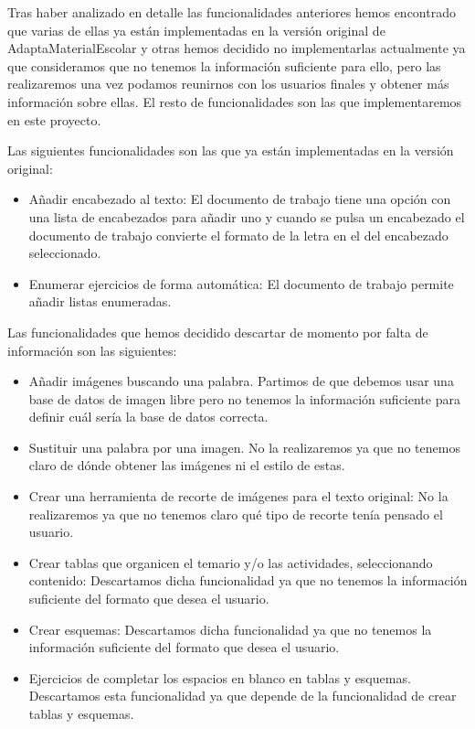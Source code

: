 Tras haber analizado en detalle las funcionalidades anteriores hemos encontrado que varias de ellas ya están implementadas en la versión original de AdaptaMaterialEscolar y otras hemos decidido no implementarlas actualmente ya que consideramos que no tenemos la información suficiente para ello, pero las realizaremos una vez podamos reunirnos con los usuarios finales y obtener más información sobre ellas. El resto de funcionalidades son las que implementaremos en este proyecto.

Las siguientes funcionalidades son las que ya están implementadas en la versión original:
\begin{itemize}
  \item Añadir encabezado al texto: El documento de trabajo tiene una opción con una lista de encabezados para añadir uno y cuando se pulsa un encabezado el documento de trabajo convierte el formato de la letra en el del encabezado seleccionado.
  \item Enumerar ejercicios de forma automática: El documento de trabajo permite añadir listas enumeradas.
\end{itemize}
Las funcionalidades que hemos decidido descartar de momento por falta de información son las siguientes:
\begin{itemize}
  \item Añadir imágenes buscando una palabra. Partimos de que debemos usar una base de datos de imagen libre pero no tenemos la información suficiente para definir cuál sería la base de datos correcta.
  \item Sustituir una palabra por una imagen. No la realizaremos ya que no tenemos claro de dónde obtener las imágenes ni el estilo de estas.
  \item Crear una herramienta de recorte de imágenes para el texto original: No la realizaremos ya que no tenemos claro qué tipo de recorte tenía pensado el usuario.
  \item Crear tablas que organicen el temario y/o las actividades, seleccionando contenido: Descartamos dicha funcionalidad ya que no tenemos la información suficiente del formato que desea el usuario.
  \item Crear esquemas: Descartamos dicha funcionalidad ya que no tenemos la información suficiente del formato que desea el usuario.
  \item Ejercicios de completar los espacios en blanco en tablas y esquemas. Descartamos esta funcionalidad ya que depende de la funcionalidad de crear tablas y esquemas.
\end{itemize}

